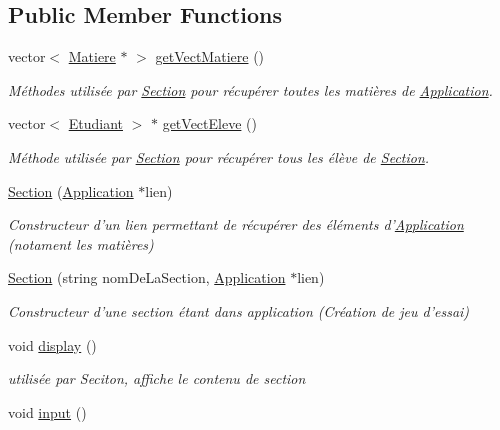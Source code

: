 \subsection*{Public Member Functions}
\begin{DoxyCompactItemize}
\item 
vector$<$ \hyperlink{class_matiere}{Matiere} $\ast$ $>$ \hyperlink{class_section_a7d11b3ccad35aea44d0e2b0ab9697e94}{get\+Vect\+Matiere} ()
\begin{DoxyCompactList}\small\item\em Méthodes utilisée par \hyperlink{class_section}{Section} pour récupérer toutes les matières de \hyperlink{class_application}{Application}. \end{DoxyCompactList}\item 
vector$<$ \hyperlink{class_etudiant}{Etudiant} $>$ $\ast$ \hyperlink{class_section_a91998036826e5c3fd63baee29f61af56}{get\+Vect\+Eleve} ()
\begin{DoxyCompactList}\small\item\em Méthode utilisée par \hyperlink{class_section}{Section} pour récupérer tous les élève de \hyperlink{class_section}{Section}. \end{DoxyCompactList}\item 
\hyperlink{class_section_a4e65b11fb3fa5fba337053389bedbfe5}{Section} (\hyperlink{class_application}{Application} $\ast$lien)
\begin{DoxyCompactList}\small\item\em Constructeur d'un lien permettant de récupérer des éléments d'\hyperlink{class_application}{Application} (notament les matières) \end{DoxyCompactList}\item 
\hyperlink{class_section_aefbd9080252dec03fa54bcf06d669956}{Section} (string nom\+De\+La\+Section, \hyperlink{class_application}{Application} $\ast$lien)
\begin{DoxyCompactList}\small\item\em Constructeur d'une section étant dans application (Création de jeu d'essai) \end{DoxyCompactList}\item 
void \hyperlink{class_section_a1f9ebccdb1937ca61a0d4adcde310832}{display} ()
\begin{DoxyCompactList}\small\item\em utilisée par Seciton, affiche le contenu de section \end{DoxyCompactList}\item 
void \hyperlink{class_section_a32e3a0a0682f01437a82ddbf7dd59b0a}{input} ()

\end{DoxyCompactItemize}
